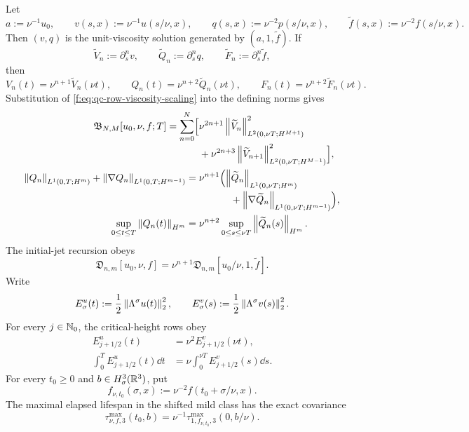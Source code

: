 \begin{proposition}
\label{f:prop:qc-exact-viscosity-scaling}
Let
\[
 a:=\nu^{-1}u_0,
 \qquad
 v(s,x):=\nu^{-1}u(s/\nu,x),
 \qquad
 q(s,x):=\nu^{-2}p(s/\nu,x),
 \qquad
 \widetilde f(s,x):=\nu^{-2}f(s/\nu,x).
\]
Then \((v,q)\) is the unit-viscosity solution generated by
\((a,1,\widetilde f)\).  If
\[
 \widetilde V_n:=\partial_s^nv,
 \qquad
 \widetilde Q_n:=\partial_s^nq,
 \qquad
 \widetilde F_n:=\partial_s^n\widetilde f,
\]
then
\begin{equation}
 V_n(t)=\nu^{n+1}\widetilde V_n(\nu t),
 \qquad
 Q_n(t)=\nu^{n+2}\widetilde Q_n(\nu t),
 \qquad
 F_n(t)=\nu^{n+2}\widetilde F_n(\nu t).
 \label{f:eq:qc-row-viscosity-scaling}
\end{equation}
Substitution of \eqref{f:eq:qc-row-viscosity-scaling} into the defining norms gives
\begin{align}
 \mathfrak B_{N,M}[u_0,\nu,f;T]
 =\sum_{n=0}^{N}\Bigl[{}
 &\nu^{2n+1}
 \left\lVert \widetilde V_n\right\rVert_{L^2(0,\nu T;H^{M+1})}^2
 \notag\\[-2pt]
 &+\nu^{2n+3}
 \left\lVert \widetilde V_{n+1}\right\rVert_{L^2(0,\nu T;H^{M-1})}^2
 \Bigr],
 \label{f:eq:qc-rectangle-viscosity-scaling}\\
 \left\lVert Q_n\right\rVert_{L^1(0,T;H^m)}
 +\left\lVert \nabla Q_n\right\rVert_{L^1(0,T;H^{m-1})}
 ={}&\nu^{n+1}\Bigl(
 \left\lVert \widetilde Q_n\right\rVert_{L^1(0,\nu T;H^m)}
 \notag\\[-2pt]
 &\hspace{32pt}+
 \left\lVert \nabla\widetilde Q_n\right\rVert_{L^1(0,\nu T;H^{m-1})}
 \Bigr),
 \label{f:eq:qc-pressure-viscosity-scaling}\\
 \sup_{0\le t\le T}\left\lVert Q_n(t)\right\rVert_{H^m}
 ={}&\nu^{n+2}
 \sup_{0\le s\le\nu T}\left\lVert \widetilde Q_n(s)\right\rVert_{H^m}.
 \label{f:eq:qc-pressure-sup-viscosity-scaling}
\end{align}
The initial-jet recursion obeys
\begin{equation}
 \mathfrak D_{n,m}[u_0,\nu,f]
 =\nu^{n+1}\mathfrak D_{n,m}[u_0/\nu,1,\widetilde f].
 \label{f:eq:qc-initial-jet-viscosity-scaling}
\end{equation}
Write
\[
 E_\sigma^u(t):=\frac12\left\lVert \Lambda^\sigma u(t)\right\rVert_2^2,
 \qquad
 E_\sigma^v(s):=\frac12\left\lVert \Lambda^\sigma v(s)\right\rVert_2^2.
\]
For every \(j\in\mathbb N_0\), the critical-height rows obey
\begin{align}
 E_{j+1/2}^u(t)
 &=\nu^2E_{j+1/2}^v(\nu t),
 \label{f:eq:qc-critical-height-viscosity-scaling}\\
 \int_0^T E_{j+1/2}^u(t)\dd t
 &=\nu\int_0^{\nu T}E_{j+1/2}^v(s)\dd s.
 \label{f:eq:qc-critical-height-mass-viscosity-scaling}
\end{align}
For every \(t_0\ge0\) and \(b\in H^3_\sigma(\mathbb R^3)\), put
\[
 f_{\nu,t_0}(\sigma,x):=\nu^{-2}f(t_0+\sigma/\nu,x).
\]
The maximal elapsed lifespan in the shifted mild class has the exact
covariance
\begin{equation}
 \tau_{\nu,f,3}^{\max}(t_0,b)
 =\nu^{-1}\tau_{1,f_{\nu,t_0},3}^{\max}(0,b/\nu).
 \label{f:eq:qc-maximal-lifespan-viscosity-scaling}
\end{equation}
\end{proposition}

